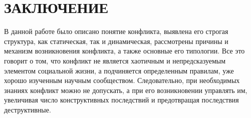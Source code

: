 \chapter*{ЗАКЛЮЧЕНИЕ}

В данной работе было описано понятие конфликта, выявлена его строгая структура,
как статическая, так и динамическая, рассмотрены причины и механизм
возникновения конфликта, а также основные его типологии. Все это говорит о том,
что конфликт не является хаотичным и непредсказуемым элементом социальной жизни,
а подчиняется определенным правилам, уже хорошо изученным научным сообществом.
Следовательно, при необходимых знаниях конфликт можно не допускать, а при его
возникновении управлять им, увеличивая число конструктивных последствий и
предотвращая последствия деструктивные.

